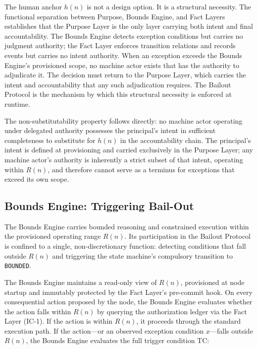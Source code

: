 The human anchor $h(n)$ is not a design option.  It is a structural necessity.
The functional separation between Purpose, Bounds Engine, and Fact Layers
establishes that the Purpose Layer is the only layer carrying both intent and
final accountability.  The Bounds Engine detects exception conditions but carries
no judgment authority; the Fact Layer enforces transition relations and records
events but carries no intent authority.  When an exception exceeds the Bounds
Engine's provisioned scope, no machine actor exists that has the authority to
adjudicate it.  The decision must return to the Purpose Layer, which carries the
intent and accountability that any such adjudication requires.  The Bailout
Protocol is the mechanism by which this structural necessity is enforced at
runtime.

The non-substitutability property follows directly: no machine actor operating
under delegated authority possesses the principal's intent in sufficient
completeness to substitute for $h(n)$ in the accountability chain.  The
principal's intent is defined at provisioning and carried exclusively in the
Purpose Layer; any machine actor's authority is inherently a strict subset of
that intent, operating within $R(n)$, and therefore cannot serve as a terminus for
exceptions that exceed its own scope.

\subsection{Bounds Engine: Triggering Bail-Out}
\label{sec:bailout-bounds-engine}

The Bounds Engine carries bounded reasoning and constrained execution within the
provisioned operating range $R(n)$.  Its participation in the Bailout Protocol
is confined to a single, non-discretionary function: detecting conditions that
fall outside $R(n)$ and triggering the state machine's compulsory transition to
\texttt{BOUNDED}.

The Bounds Engine maintains a read-only view of $R(n)$, provisioned at node
startup and immutably protected by the Fact Layer's pre-commit hook.  On every
consequential action proposed by the node, the Bounds Engine evaluates whether
the action falls within $R(n)$ by querying the authorization ledger via the Fact
Layer (IC-1).  If the action is within $R(n)$, it proceeds through the standard
execution path.  If the action---or an observed exception condition $x$---falls
outside $R(n)$, the Bounds Engine evaluates the full trigger condition TC:

